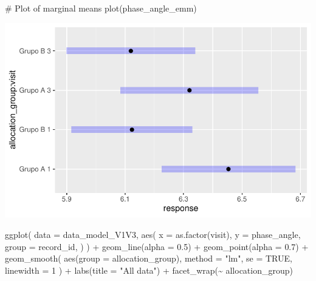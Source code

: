 \documentclass[
  letterpaper,
  DIV=11,
  numbers=noendperiod]{scrartcl}
\newenvironment{Shaded}{\begin{snugshade}}{\end{snugshade}}
\newcommand{\AttributeTok}[1]{\textcolor[rgb]{0.40,0.45,0.13}{#1}}
\newcommand{\CommentTok}[1]{\textcolor[rgb]{0.37,0.37,0.37}{#1}}
\newcommand{\ConstantTok}[1]{\textcolor[rgb]{0.56,0.35,0.01}{#1}}
\newcommand{\DecValTok}[1]{\textcolor[rgb]{0.68,0.00,0.00}{#1}}
\newcommand{\FloatTok}[1]{\textcolor[rgb]{0.68,0.00,0.00}{#1}}
\newcommand{\FunctionTok}[1]{\textcolor[rgb]{0.28,0.35,0.67}{#1}}
\newcommand{\NormalTok}[1]{\textcolor[rgb]{0.00,0.23,0.31}{#1}}
\newcommand{\SpecialCharTok}[1]{\textcolor[rgb]{0.37,0.37,0.37}{#1}}
\newcommand{\StringTok}[1]{\textcolor[rgb]{0.13,0.47,0.30}{#1}}
\begin{document}
\begin{Shaded}
\begin{Highlighting}[]
\CommentTok{\# Plot of marginal means}
\FunctionTok{plot}\NormalTok{(phase\_angle\_emm)}
\end{Highlighting}
\end{Shaded}

\includegraphics{Outcomes_V1V2V3_files/figure-pdf/phase_angle_sens_emm-1.pdf}

\begin{Shaded}
\begin{Highlighting}[]
\FunctionTok{ggplot}\NormalTok{(}
    \AttributeTok{data =}\NormalTok{ data\_model\_V1V3, }
    \FunctionTok{aes}\NormalTok{(}
        \AttributeTok{x =} \FunctionTok{as.factor}\NormalTok{(visit),}
        \AttributeTok{y =}\NormalTok{ phase\_angle,}
        \AttributeTok{group =}\NormalTok{ record\_id,}
\NormalTok{    )}
\NormalTok{) }\SpecialCharTok{+}
    \FunctionTok{geom\_line}\NormalTok{(}\AttributeTok{alpha =} \FloatTok{0.5}\NormalTok{) }\SpecialCharTok{+}
    \FunctionTok{geom\_point}\NormalTok{(}\AttributeTok{alpha =} \FloatTok{0.7}\NormalTok{) }\SpecialCharTok{+}
    \FunctionTok{geom\_smooth}\NormalTok{(}
        \FunctionTok{aes}\NormalTok{(}\AttributeTok{group =}\NormalTok{ allocation\_group),}
        \AttributeTok{method =} \StringTok{"lm"}\NormalTok{,}
        \AttributeTok{se =} \ConstantTok{TRUE}\NormalTok{,}
        \AttributeTok{linewidth =} \DecValTok{1}
\NormalTok{    ) }\SpecialCharTok{+}
    \FunctionTok{labs}\NormalTok{(}\AttributeTok{title =} \StringTok{"All data"}\NormalTok{) }\SpecialCharTok{+}
    \FunctionTok{facet\_wrap}\NormalTok{(}\SpecialCharTok{\textasciitilde{}}\NormalTok{ allocation\_group)}
\end{Highlighting}
\end{Shaded}
\end{document}
